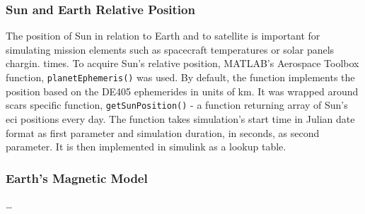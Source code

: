         \subsubsection{Sun and Earth Relative Position}
            The position of Sun in relation to Earth and to satellite is important for simulating mission elements such as spacecraft temperatures or solar panels chargin. times. To acquire Sun's relative position, MATLAB's Aerospace Toolbox function, \verb|planetEphemeris()| was used. By default, the function implements the position based on the DE405 ephemerides in units of km. It was wrapped around \ac{scars} specific function, \verb|getSunPosition()| - a function returning array of Sun's \ac{eci} positions every day. The function takes simulation's start time in Julian date format as first parameter and simulation duration, in seconds, as second parameter. It is then implemented in simulink as a lookup table.

        \subsubsection{Earth's Magnetic Model}
            \dots